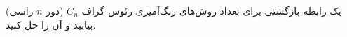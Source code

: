 \EXERCISE
یک رابطه بازگشتی برای تعداد روش‌های رنگ‌آمیزی رئوس گراف
$C_n$
(دور
$n$
راسی) بیابید و آن را حل کنید.